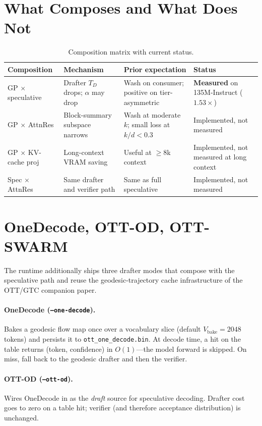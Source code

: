 \documentclass[11pt]{article}
\begin{document}
\section{What Composes and What Does Not}
\label{sec:compose}
\begin{table}[h]\centering\small
\caption{Composition matrix with current status.}
\begin{tabularx}{\textwidth}{@{}lXXl@{}}
\toprule
Composition & Mechanism & Prior expectation & Status \\
\midrule
GP $\times$ speculative   & Drafter $T_D$ drops; $\alpha$ may drop & Wash on consumer; positive on tier-asymmetric & \textbf{Measured} on 135M-Instruct ($1.53\times$) \\
GP $\times$ AttnRes       & Block-summary subspace narrows & Wash at moderate $k$; small loss at $k/d{<}0.3$ & Implemented, not measured \\
GP $\times$ KV-cache proj & Long-context VRAM saving & Useful at $\geq 8$k context & Implemented, not measured at long context \\
Spec $\times$ AttnRes     & Same drafter and verifier path & Same as full speculative & Implemented, not measured \\
\bottomrule
\end{tabularx}
\end{table}

\section{OneDecode, OTT-OD, OTT-SWARM}
The runtime additionally ships three drafter modes that compose with the
speculative path and reuse the geodesic-trajectory cache infrastructure
of the OTT/GTC companion paper.

\paragraph{OneDecode (\texttt{--one-decode}).}  Bakes a geodesic flow
map once over a vocabulary slice (default $V_\text{bake}{=}2048$
tokens) and persists it to \texttt{ott\_one\_decode.bin}.  At decode
time, a hit on the table returns (token, confidence) in $O(1)$---the
model forward is skipped.  On miss, fall back to the geodesic drafter
and then the verifier.

\paragraph{OTT-OD (\texttt{--ott-od}).}  Wires OneDecode in as the
\emph{draft} source for speculative decoding.  Drafter cost goes to zero
on a table hit; verifier (and therefore acceptance distribution) is
unchanged.
\end{document}
